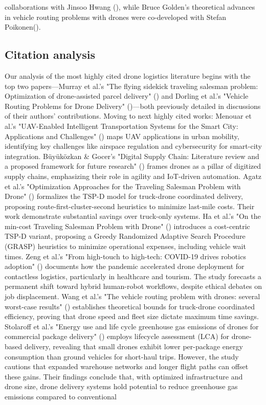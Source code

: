 \documentclass{article}
\begin{document}
collaborations with Jinsoo Hwang (\cite{WOS:000514800800001, WOS:000605628800016, WOS:000623397300001}), while Bruce Golden’s theoretical advances in vehicle routing problems with drones were co-developed with Stefan Poikonen(\cite{WOS:000400384200003, WOS:000468604000010}).

\subsection{Citation analysis}
Our analysis of the most highly cited drone logistics literature begins with the top two papers—Murray et al.'s "The flying sidekick traveling salesman problem: Optimization of drone-assisted parcel delivery" (\cite{WOS:000353871700006}) and Dorling et al.'s "Vehicle Routing Problems for Drone Delivery" (\cite{WOS:000391480400007})—both previously detailed in discussions of their authors' contributions. Moving to next highly cited works: Menouar et al.'s "UAV-Enabled Intelligent Transportation Systems for the Smart City: Applications and Challenges" (\cite{WOS:000398037700003}) maps UAV applications in urban mobility, identifying key challenges like airspace regulation and cybersecurity for smart-city integration. Büyüközkan \& Gocer's "Digital Supply Chain: Literature review and a proposed framework for future research" (\cite{WOS:000432504700016}) frames drones as a pillar of digitized supply chains, emphasizing their role in agility and IoT-driven automation. Agatz et al.'s "Optimization Approaches for the Traveling Salesman Problem with Drone" (\cite{WOS:000442591800013}) formalizes the TSP-D model for truck-drone coordinated delivery, proposing route-first-cluster-second heuristics to minimize last-mile costs. Their work demonstrate substantial savings over truck-only systems. Ha et al.'s "On the min-cost Traveling Salesman Problem with Drone" (\cite{WOS:000442591800013}) introduces a cost-centric TSP-D variant, proposing a Greedy Randomized Adaptive Search Procedure (GRASP) heuristics to minimize operational expenses, including vehicle wait times. Zeng et al.'s "From high-touch to high-tech: COVID-19 drives robotics adoption" (\cite{WOS:000534121800001}) documents how the pandemic accelerated drone deployment for contactless logistics, particularly in healthcare and tourism. The study forecasts a permanent shift toward hybrid human-robot workflows, despite ethical debates on job displacement. Wang et al.'s "The vehicle routing problem with drones: several worst-case results" (\cite{WOS:000400384200003}) establishes theoretical bounds for truck-drone coordinated efficiency, proving that drone speed and fleet size dictate maximum time savings. Stolaroff et al.'s "Energy use and life cycle greenhouse gas emissions of drones for commercial package delivery" (\cite{WOS:000424872000001}) employs lifecycle assessment (LCA) for drone-based delivery, revealing that small drones exhibit lower per-package energy consumption than ground vehicles for short-haul trips. However, the study cautions that expanded warehouse networks and longer flight paths can offset these gains. Their findings conclude that, with optimized infrastructure and drone size, drone delivery systems hold potential to reduce greenhouse gas emissions compared to conventional 
\end{document}
